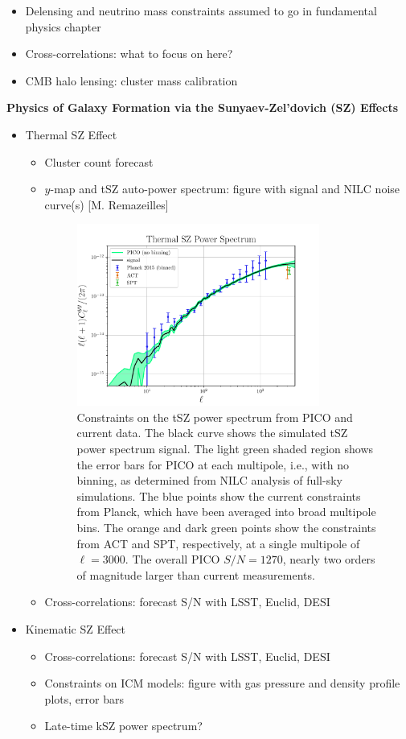 \documentclass[PICOReport.tex]{subfiles}
\begin{document}
\begin{itemize}
\item Delensing and neutrino mass constraints assumed to go in fundamental physics chapter
\item Cross-correlations: what to focus on here?
\item CMB halo lensing: cluster mass calibration
\end{itemize}

{\bf Physics of Galaxy Formation via the Sunyaev-Zel'dovich (SZ) Effects}
\begin{itemize}
\item{Thermal SZ Effect}
\begin{itemize}
\item Cluster count forecast
\item{$y$-map and tSZ auto-power spectrum: figure with signal and NILC noise curve(s) [M. Remazeilles]}

\begin{figure}
\includegraphics[width=0.8\textwidth]{images/PICO_tSZ_PS_plot.pdf}
\caption{\label{fig:PICO_tSZ_PS} Constraints on the tSZ power spectrum from PICO and current data.  The black curve shows the simulated tSZ power spectrum signal.  The light green shaded region shows the error bars for PICO at each multipole, i.e., with no binning, as determined from NILC analysis of full-sky simulations.  The blue points show the current constraints from Planck, which have been averaged into broad multipole bins.  The orange and dark green points show the constraints from ACT and SPT, respectively, at a single multipole of $\ell=3000$.  The overall PICO $S/N = 1270$, nearly two orders of magnitude larger than current measurements.}
\end{figure}

\item Cross-correlations: forecast S/N with LSST, Euclid, DESI
\end{itemize}
\item Kinematic SZ Effect
\begin{itemize}
\item Cross-correlations: forecast S/N with LSST, Euclid, DESI
\item Constraints on ICM models: figure with gas pressure and density profile plots, error bars
\item Late-time kSZ power spectrum?
\end{itemize}
\end{itemize}
\end{document}
